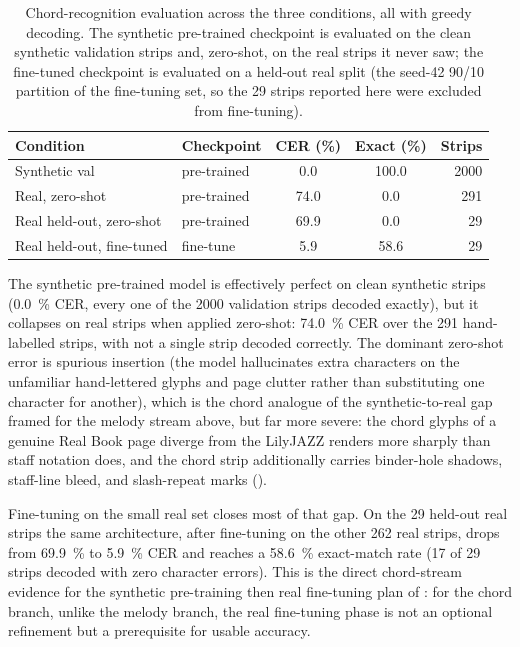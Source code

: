 \begin{table}[ht]
    \centering
    \caption{Chord-recognition evaluation across the three conditions, all with
    greedy decoding.  The synthetic pre-trained checkpoint is evaluated on
    the clean synthetic validation strips and, zero-shot, on the real
    strips it never saw; the fine-tuned checkpoint is evaluated on a
    held-out real split (the seed-42 90/10 partition of the fine-tuning
    set, so the \num{29} strips reported here were excluded from
    fine-tuning).}
    \label{tab:chord-eval}
    \small
    \setlength{\tabcolsep}{6pt}
    \renewcommand{\arraystretch}{1.25}
    \begin{tabular}{@{} l l S[table-format=2.1] S[table-format=3.1] r @{}}
        \toprule
        \textbf{Condition} & \textbf{Checkpoint} & {\textbf{CER (\%)}}
            & {\textbf{Exact (\%)}} & \textbf{Strips} \\
        \midrule
        Synthetic val          & pre-trained &  0.0 & 100.0 & 2000 \\
        Real, zero-shot        & pre-trained & 74.0 &   0.0 &  291 \\
        Real held-out, zero-shot & pre-trained & 69.9 &   0.0 &   29 \\
        Real held-out, fine-tuned & fine-tune &  5.9 &  58.6 &   29 \\
        \bottomrule
    \end{tabular}
\end{table}

The synthetic pre-trained model is effectively perfect on clean synthetic
strips (\SI{0.0}{\percent} CER, every one of the \num{2000} validation
strips decoded exactly), but it collapses on real strips when applied
zero-shot: \SI{74.0}{\percent} CER over the \num{291} hand-labelled
strips, with not a single strip decoded correctly.  The dominant
zero-shot error is spurious insertion (the model hallucinates extra
characters on the unfamiliar hand-lettered glyphs and page clutter
rather than substituting one character for another), which is the chord
analogue of the synthetic-to-real gap framed for the melody stream
above, but far more severe: the chord glyphs of a genuine Real Book page
diverge from the LilyJAZZ renders more sharply than staff notation
does, and the chord strip additionally carries binder-hole shadows,
staff-line bleed, and slash-repeat marks ().

Fine-tuning on the small real set closes most of that gap.  On the
\num{29} held-out real strips the same architecture, after fine-tuning
on the other \num{262} real strips, drops from \SI{69.9}{\percent} to
\SI{5.9}{\percent} CER and reaches a \SI{58.6}{\percent} exact-match
rate (17 of 29 strips decoded with zero character errors).  This is the
direct chord-stream evidence for the synthetic pre-training then
real fine-tuning plan of : for the chord
branch, unlike the melody branch, the real fine-tuning phase is not an
optional refinement but a prerequisite for usable accuracy.

